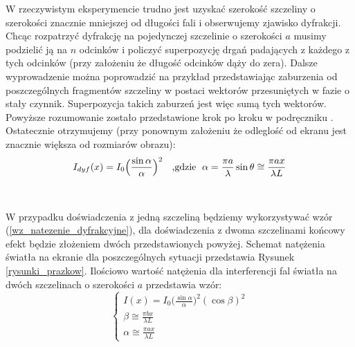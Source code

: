\documentclass{article}
\begin{document}
W rzeczywistym eksperymencie trudno jest uzyskać szerokość szczeliny o szerokości znacznie mniejszej od długości fali i obserwujemy zjawisko dyfrakcji. Chcąc rozpatrzyć dyfrakcję na pojedynczej szczelinie o szerokości $a$ musimy podzielić ją na $n$ odcinków i policzyć superpozycję drgań padających z każdego z tych odcinków (przy założeniu że długość odcinków dąży do zera). Dalsze wyprowadzenie można poprowadzić na przykład przedstawiając zaburzenia od poszczególnych fragmentów szczeliny w postaci wektorów przesuniętych w fazie o stały czynnik. Superpozycja takich zaburzeń jest więc sumą tych wektorów. Powyższe rozumowanie zostało przedstawione krok po kroku w podręczniku \cite{5}. Ostatecznie otrzymujemy (przy ponownym założeniu że odleglość od ekranu jest znacznie większa od rozmiarów obrazu)\cite{1}:
\begin{equation}
I_{dyf}(x) = I_0\Big(\frac{\sin \alpha}{\alpha}\Big)^2\text{  \hspace{0.1cm} ,gdzie   \hspace{0.1cm}} \alpha=\frac{\pi a}{\lambda}\sin\theta \cong \frac{\pi a x}{\lambda L}
\label{wz_natezenie_dyfrakcyjne}
\end{equation}\\\\

W przypadku doświadczenia z jedną szczeliną będziemy wykorzystywać wzór (\ref{wz_natezenie_dyfrakcyjne}), dla doświadczenia z dwoma szczelinami końcowy efekt będzie złożeniem dwóch przedstawionych powyżej. Schemat natężenia światła na ekranie dla poszczególnych sytuacji przedstawia Rysunek \ref{rysunki_prazkow}. Ilościowo wartość natężenia dla interferencji fal światła na dwóch szczelinach o szerokości $a$ przedstawia wzór:
\begin{equation}
\begin{cases}
I(x) = I_0\Big(\frac{\sin \alpha}{\alpha}\Big)^2(\cos \beta)^2   \\
\beta \cong \frac{\pi b x}{\lambda L}\\
\alpha \cong \frac{\pi a x}{\lambda L}
\end{cases}
\end{equation}
\end{document}
